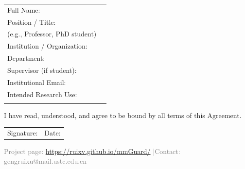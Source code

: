 \documentclass[11pt]{article}
\makeatletter
\newcommand{\contactemail}{gengruixu@mail.ustc.edu.cn}
\makeatother
\begin{document}
\begin{tabular}{@{}p{}p{}@{}}
Full Name: & \hrulefill \\
Position / Title: & \hrulefill \\
(e.g., Professor, PhD student) & \\
Institution / Organization: & \hrulefill \\
Department: & \hrulefill \\
Supervisor (if student): & \hrulefill \\
Institutional Email: & \hrulefill \\
Intended Research Use: & \hrulefill \\
 & \hrulefill \\
\end{tabular}

\vspace{1.5em}

I have read, understood, and agree to be bound by all terms of this Agreement.

\vspace{2em}

\begin{tabular}{@{}p{}p{}@{}}
Signature: \hrulefill & Date: \hrulefill \\
\end{tabular}

\vfill
\begin{center}
\small\textcolor{gray}{Project page: \href{https://ruixv.github.io/mmGuard/}{https://ruixv.github.io/mmGuard/} \quad|\quad Contact: \contactemail}
\end{center}
\end{document}

